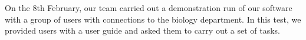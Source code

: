 On the 8th February, our team carried out a demonstration run of our software with a group of users with connections to the biology department. In this test, we provided users with a user guide and asked them to carry out a set of tasks.

